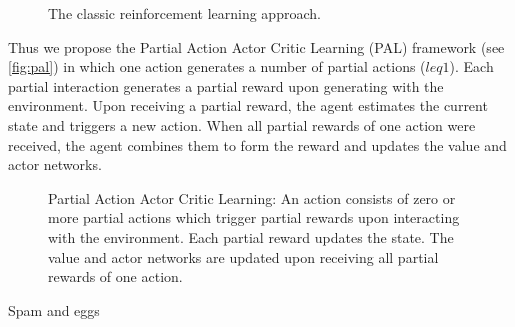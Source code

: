 \documentclass[sigconf]{acmart}
\begin{document}
\begin{figure}

\caption{The classic reinforcement learning approach.\protect\footnotemark}
\label{fig:reinforcement}
\end{figure}

Thus we propose the Partial Action Actor Critic Learning (PAL) framework (see \autoref{fig:pal}) in which one action generates a number of partial actions ($leq 1$). Each partial interaction generates a partial reward upon generating with the environment. Upon receiving a partial reward, the agent estimates the current state and triggers a new action. When all partial rewards of one action were received, the agent combines them to form the reward and updates the value and actor networks. 

\begin{figure}

\caption{Partial Action Actor Critic Learning: An action consists of zero or more partial actions which trigger partial rewards upon interacting with the environment. Each partial reward updates the state. The value and actor networks are updated upon receiving all partial rewards of one action.\protect\footnotemark}
\label{fig:pal}
\end{figure}

Spam and eggs
 


\end{document}

